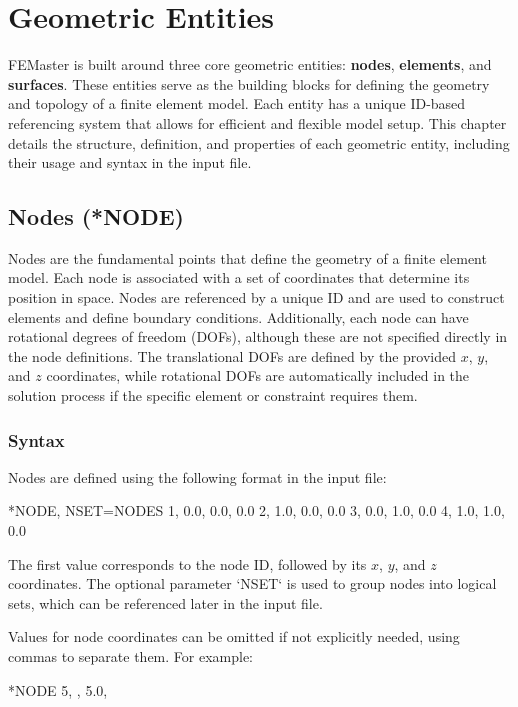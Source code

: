 \chapter{Geometric Entities}
\label{chap:geometric_entities}

FEMaster is built around three core geometric entities: \textbf{nodes}, \textbf{elements}, and \textbf{surfaces}. These entities serve as the building blocks for defining the geometry and topology of a finite element model. Each entity has a unique ID-based referencing system that allows for efficient and flexible model setup. This chapter details the structure, definition, and properties of each geometric entity, including their usage and syntax in the input file.
\section{Nodes (*NODE)}
Nodes are the fundamental points that define the geometry of a finite element model. Each node is associated with a set of coordinates that determine its position in space. Nodes are referenced by a unique ID and are used to construct elements and define boundary conditions. Additionally, each node can have rotational degrees of freedom (DOFs), although these are not specified directly in the node definitions. The translational DOFs are defined by the provided $x$, $y$, and $z$ coordinates, while rotational DOFs are automatically included in the solution process if the specific element or constraint requires them.

\subsection{Syntax}
Nodes are defined using the following format in the input file:

\begin{codeBlock}
*NODE, NSET=NODES
1, 0.0, 0.0, 0.0
2, 1.0, 0.0, 0.0
3, 0.0, 1.0, 0.0
4, 1.0, 1.0, 0.0
\end{codeBlock}

The first value corresponds to the node ID, followed by its $x$, $y$, and $z$ coordinates.
The optional parameter `NSET` is used to group nodes into logical sets, which can be referenced later in the input file.

Values for node coordinates can be omitted if not explicitly needed, using commas to separate them. For example:

\begin{codeBlock}
*NODE
5, , 5.0,
\end{codeBlock}

